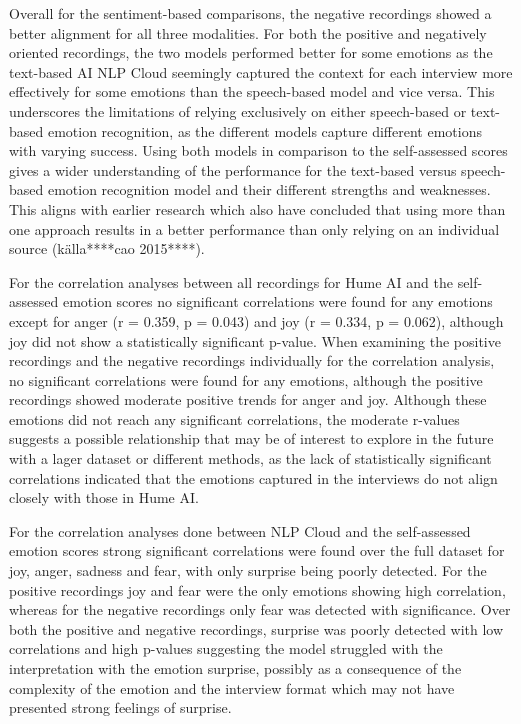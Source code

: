 Overall for the sentiment-based comparisons, the negative recordings showed a better alignment for all three modalities. For both the positive and negatively oriented recordings, the two models performed better for some emotions as the text-based AI NLP Cloud seemingly captured the context for each interview more effectively for some emotions than the speech-based model and vice versa. This underscores the limitations of relying exclusively on either speech-based or text-based emotion recognition, as the different models capture different emotions with varying success. Using both models in comparison to the self-assessed scores gives a wider understanding of the performance for the text-based versus speech-based emotion recognition model and their different strengths and weaknesses. This aligns with earlier research which also have concluded that using more than one approach results in a better performance than only relying on an individual source (källa****cao 2015****).

For the correlation analyses between all recordings for Hume AI and the self-assessed emotion scores no significant correlations were found for any emotions except for anger (r = 0.359, p = 0.043) and joy (r = 0.334, p = 0.062), although joy did not show a statistically significant p-value. 
When examining the positive recordings and the negative recordings individually for the correlation analysis, no significant correlations were found for any emotions, although the positive recordings showed moderate positive trends for anger and joy. Although these emotions did not reach any significant correlations, the moderate r-values suggests a possible relationship that may be of interest to explore in the future with a lager dataset or different methods, as the lack of statistically significant correlations indicated that the emotions captured in the interviews do not align closely with those in Hume AI. 

For the correlation analyses done between NLP Cloud and the self-assessed emotion scores strong significant correlations were found over the full dataset for joy, anger, sadness and fear, with only surprise being poorly detected.
For the positive recordings joy and fear were the only emotions showing high correlation, whereas for the negative recordings only fear was detected with significance. Over both the positive and negative recordings, surprise was poorly detected with low correlations and high p-values suggesting the model struggled with the interpretation with the emotion surprise, possibly as a consequence of the complexity of the emotion and the interview format which may not have presented strong feelings of surprise.

